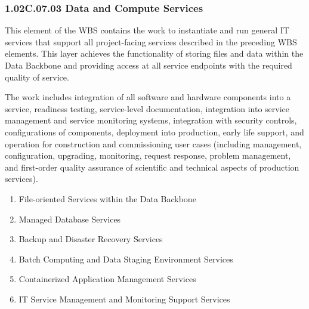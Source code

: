\subsubsection{1.02C.07.03 Data and Compute Services}

This element of the WBS contains the work to instantiate and run general IT services that support all project-facing services described in the preceding WBS elements.
This layer achieves the functionality of storing files and data within the Data Backbone and providing access at all service endpoints with the required quality of service.

The work includes integration of all software and hardware components into a service, readiness testing, service-level documentation, integration into service management and service monitoring systems, integration with security controls, configurations of components, deployment into production, early life support, and operation for construction and commissioning user cases (including management, configuration, upgrading, monitoring, request response, problem management, and first-order quality assurance of scientific and technical aspects of production services).

\begin{enumerate}

  \item{File-oriented Services within the Data Backbone}
  \item{Managed Database Services}
  \item{Backup and Disaster Recovery Services}
  \item{Batch Computing and Data Staging Environment Services}
  \item{Containerized Application Management Services}
  \item{IT Service Management and Monitoring Support Services}

\end{enumerate}

